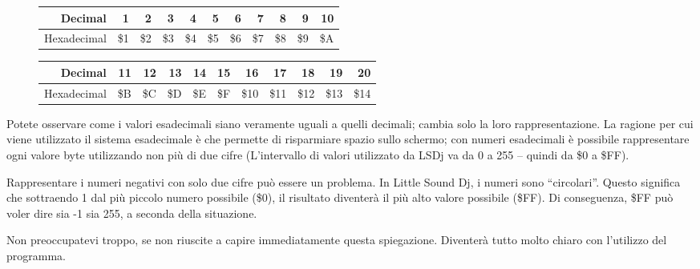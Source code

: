 \begin{figure}[hbtp]
\centering

\begin{tabular}{r|r|r|r|r|r|r|r|r|r|r}
 Decimal & 1 & 2 & 3 & 4 & 5 & 6 & 7 & 8 & 9 & 10 \\
\hline
 Hexadecimal & \$1 & \$2 & \$3 & \$4 & \$5 & \$6 & \$7 & \$8 & \$9 & \$A \\
\end{tabular}

\begin{tabular}{r|r|r|r|r|r|r|r|r|r|r}
 Decimal & 11 & 12 & 13 & 14 & 15 & 16 & 17 & 18 & 19 & 20 \\
\hline
 Hexadecimal & \$B & \$C & \$D & \$E & \$F & \$10 & \$11 & \$12 & \$13 & \$14  \\
\end{tabular}

\end{figure}

Potete osservare come i valori esadecimali siano veramente uguali a quelli decimali; cambia solo la loro rappresentazione. La ragione per cui viene utilizzato il sistema esadecimale è che permette di risparmiare spazio sullo schermo; con numeri esadecimali è possibile rappresentare ogni valore byte utilizzando non più di due cifre (L'intervallo di valori utilizzato
da LSDj va da 0 a 255 – quindi da \$0 a \$FF). 

Rappresentare i numeri negativi con solo due cifre può essere un problema. In Little Sound Dj, i numeri sono “circolari”. Questo significa che sottraendo 1 dal più piccolo
numero possibile (\$0), il risultato diventerà il più alto valore possibile (\$FF). Di conseguenza, \$FF può voler dire sia -1 sia 255, a seconda della situazione. 

Non preoccupatevi troppo, se non riuscite a capire immediatamente questa spiegazione. Diventerà tutto molto chiaro con l'utilizzo del programma. 
